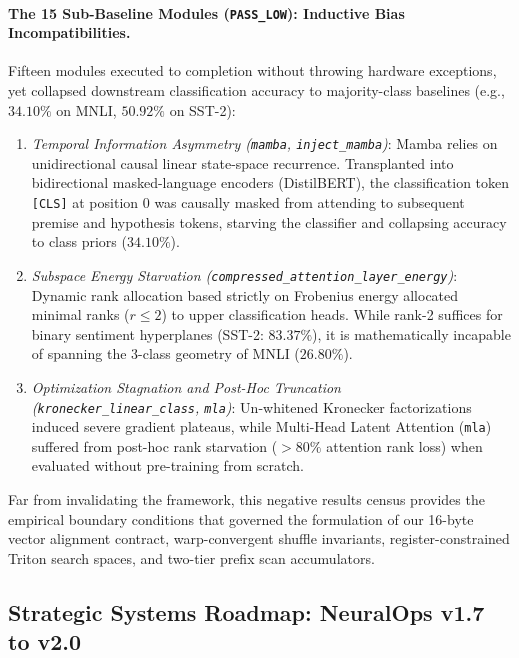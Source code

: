 \paragraph{The 15 Sub-Baseline Modules (\texttt{PASS\_LOW}): Inductive Bias Incompatibilities.}
Fifteen modules executed to completion without throwing hardware exceptions, yet collapsed downstream classification accuracy to majority-class baselines (e.g., $34.10\%$ on MNLI, $50.92\%$ on SST-2):
\begin{enumerate}
    \item \emph{Temporal Information Asymmetry (\texttt{mamba}, \texttt{inject\_mamba})}: Mamba relies on unidirectional causal linear state-space recurrence. Transplanted into bidirectional masked-language encoders (DistilBERT), the classification token \texttt{[CLS]} at position 0 was causally masked from attending to subsequent premise and hypothesis tokens, starving the classifier and collapsing accuracy to class priors ($34.10\%$).
    \item \emph{Subspace Energy Starvation (\texttt{compressed\_attention\_layer\_energy})}: Dynamic rank allocation based strictly on Frobenius energy allocated minimal ranks ($r \le 2$) to upper classification heads. While rank-2 suffices for binary sentiment hyperplanes (SST-2: $83.37\%$), it is mathematically incapable of spanning the 3-class geometry of MNLI ($26.80\%$).
    \item \emph{Optimization Stagnation and Post-Hoc Truncation (\texttt{kronecker\_linear\_class}, \texttt{mla})}: Un-whitened Kronecker factorizations induced severe gradient plateaus, while Multi-Head Latent Attention (\texttt{mla}) suffered from post-hoc rank starvation ($>80\%$ attention rank loss) when evaluated without pre-training from scratch.
\end{enumerate}
Far from invalidating the framework, this negative results census provides the empirical boundary conditions that governed the formulation of our 16-byte vector alignment contract, warp-convergent shuffle invariants, register-constrained Triton search spaces, and two-tier prefix scan accumulators.

\subsection{Strategic Systems Roadmap: NeuralOps v1.7 to v2.0}
\label{subsec:strategic_roadmap}

